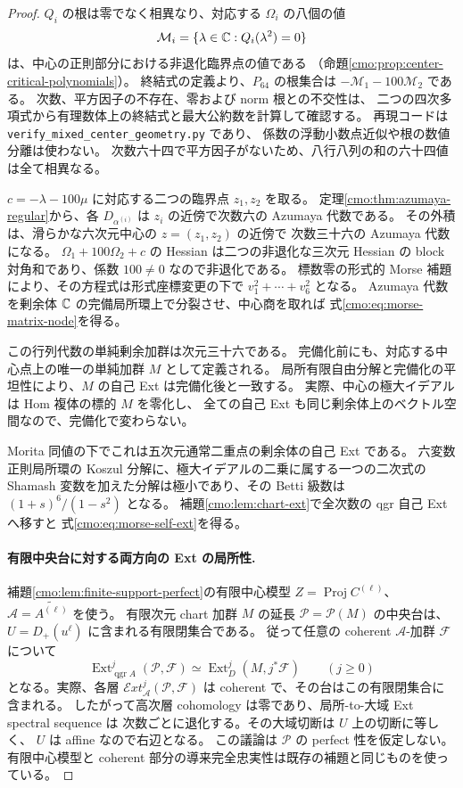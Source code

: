 \begin{proof}
$Q_i$ の根は零でなく相異なり、対応する $\Omega_i$ の八個の値
\[
 \mathcal M_i=\{\lambda\in\mathbb C:Q_i(\lambda^2)=0\}
\]
は、中心の正則部分における非退化臨界点の値である
（命題\ref{cmo:prop:center-critical-polynomials}）。
終結式の定義より、$P_{64}$ の根集合は
$-\mathcal M_1-100\mathcal M_2$ である。
次数、平方因子の不存在、零および norm 根との不交性は、
二つの四次多項式から有理数体上の終結式と最大公約数を計算して確認する。
再現コードは \texttt{verify\_mixed\_center\_geometry.py} であり、
係数の浮動小数点近似や根の数値分離は使わない。
次数六十四で平方因子がないため、八行八列の和の六十四値は全て相異なる。

$c=-\lambda-100\mu$ に対応する二つの臨界点 $z_1,z_2$ を取る。
定理\ref{cmo:thm:azumaya-regular}から、各 $D_{\alpha^{(i)}}$ は
$z_i$ の近傍で次数六の Azumaya 代数である。
その外積は、滑らかな六次元中心の $z=(z_1,z_2)$ の近傍で
次数三十六の Azumaya 代数になる。
$\Omega_1+100\Omega_2+c$ の Hessian は二つの非退化な三次元 Hessian の
block 対角和であり、係数 $100\ne0$ なので非退化である。
標数零の形式的 Morse 補題により、その方程式は形式座標変更の下で
$v_1^2+\cdots+v_6^2$ となる。
Azumaya 代数を剰余体 $\mathbb C$ の完備局所環上で分裂させ、中心商を取れば
式\eqref{cmo:eq:morse-matrix-node}を得る。

この行列代数の単純剰余加群は次元三十六である。
完備化前にも、対応する中心点上の唯一の単純加群 $M$ として定義される。
局所有限自由分解と完備化の平坦性により、$M$ の自己 Ext は完備化後と一致する。
実際、中心の極大イデアルは Hom 複体の標的 $M$ を零化し、
全ての自己 Ext も同じ剰余体上のベクトル空間なので、完備化で変わらない。

Morita 同値の下でこれは五次元通常二重点の剰余体の自己 Ext である。
六変数正則局所環の Koszul 分解に、極大イデアルの二乗に属する一つの二次式の
Shamash 変数を加えた分解は極小であり、その Betti 級数は
$(1+s)^6/(1-s^2)$ となる。
補題\ref{cmo:lem:chart-ext}で全次数の qgr 自己 Ext へ移すと
式\eqref{cmo:eq:morse-self-ext}を得る。

\paragraph{有限中央台に対する両方向の Ext の局所性.}
補題\ref{cmo:lem:finite-support-perfect}の有限中心模型
$Z=\operatorname{Proj}C^{(\ell)}$、$\mathcal A=\widetilde{A^{(\ell)}}$ を使う。
有限次元 chart 加群 $M$ の延長 $\mathcal P=\mathcal P(M)$ の中央台は、
$U=D_+(u^\ell)$ に含まれる有限閉集合である。
従って任意の coherent $\mathcal A$-加群 $\mathcal F$ について
\begin{equation}\label{cmo:eq:finite-support-local-ext}
 \operatorname{Ext}^j_{\operatorname{qgr}A}(\mathcal P,\mathcal F)
 \simeq\operatorname{Ext}^j_D(M,j^*\mathcal F)
 \qquad(j\ge0)
\end{equation}
となる。実際、各層 $\mathcal E xt^j_{\mathcal A}(\mathcal P,\mathcal F)$ は
coherent で、その台はこの有限閉集合に含まれる。
したがって高次層 cohomology は零であり、局所-to-大域 Ext spectral sequence は
次数ごとに退化する。その大域切断は $U$ 上の切断に等しく、
$U$ は affine なので右辺となる。
この議論は $\mathcal P$ の perfect 性を仮定しない。
有限中心模型と coherent 部分の導来完全忠実性は既存の補題と同じものを使っている。


\end{proof}
